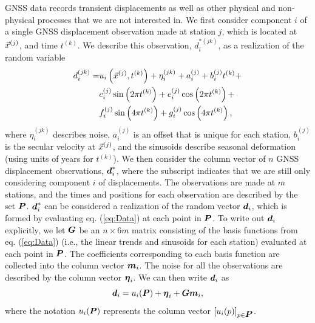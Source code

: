 \documentclass[extra,mreferee]{gji}
\begin{document}
GNSS data records transient displacements as well as other physical
and non-physical processes that we are not interested in. We first
consider component $i$ of a single GNSS displacement observation made
at station $j$, which is located at $\vec{x}^{(j)}$, and time $t^{(k)}$.
We describe this observation, $d_i^{*(jk)}$, as a realization of the
random variable
\begin{align}\label{eq:Data}
\begin{split}
d_i^{(jk)} = &u_i\left(\vec{x}^{(j)},t^{(k)}\right) + 
              \eta_i^{(jk)} + 
              a_i^{(j)} + b_i^{(j)}t^{(k)} + \\
             &c_i^{(j)}\sin\left(2 \pi t^{(k)}\right) +  
              e_i^{(j)}\cos\left(2 \pi t^{(k)}\right) + \\ 
             &f_i^{(j)}\sin\left(4 \pi t^{(k)}\right)  + 
              g_i^{(j)}\cos\left(4 \pi t^{(k)}\right), 
\end{split}
\end{align}
where $\eta_i^{(jk)}$ describes noise, $a_i^{(j)}$ is an offset that
is unique for each station, $b_i^{(j)}$ is the secular velocity at
$\vec{x}^{(j)}$, and the sinusoids describe seasonal deformation (using
units of years for $t^{(k)}$). We then consider the column vector of
$n$ GNSS displacement observations, $\data^*_i$, where the subscript
indicates that we are still only considering component $i$ of
displacements. The observations are made at $m$ stations, and the
times and positions for each observation are described by the set
$\points$. $\data^*_i$ can be considered a realization of the random
vector $\data_i$, which is formed by evaluating eq. (\ref{eq:Data}) at
each point in $\points$. To write out $\data_i$ explicitly, we let
$\G$ be an $n \times 6m$ matrix consisting of the basis functions from
eq. (\ref{eq:Data}) (i.e., the linear trends and sinusoids for each
station) evaluated at each point in $\points$. The coefficients
corresponding to each basis function are collected into the column
vector $\mitbf{m}_i$. The noise for all the observations are described
by the column vector $\mitbf{\eta}_i$. We can then write $\data_i$ as
\begin{equation}\label{eq:DataVec}
\data_i = u_i(\points) + \mitbf{\eta}_i + \G\mitbf{m}_i,
\end{equation}
where the notation $u_i(\points)$ represents the column vector
$[u_i(p)]_{p \in \points}$.
\end{document}
